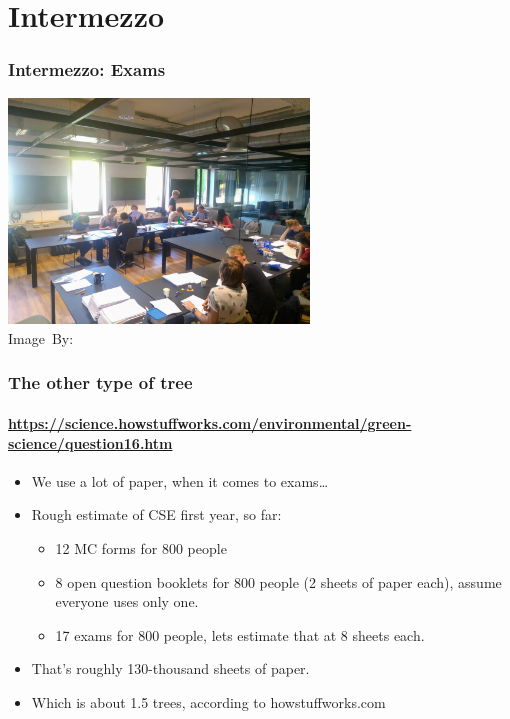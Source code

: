\section{Intermezzo}
\label{sec:intermezzo}

\begin{frame}
	\frametitle{Intermezzo: Exams}
	\begin{center}
		\includegraphics[width=0.6\textwidth]{figures/grading.jpg}\\
		\hspace*{15pt}\hbox{\scriptsize Image By:}
	\end{center}
\end{frame}

\begin{frame}
	\frametitle{The other type of tree}
	\framesubtitle{\url{https://science.howstuffworks.com/environmental/green-science/question16.htm}}
	\begin{itemize}
		\item We use a lot of paper, when it comes to exams\dots
			\pause
		\item Rough estimate of CSE first year, so far:
			\begin{itemize}
				\item 12 MC forms for 800 people
				\item 8 open question booklets for 800 people (2 sheets of paper each), assume everyone uses only one.
				\item 17 exams for 800 people, lets estimate that at 8 sheets each.
			\end{itemize}
			\pause
		\item	That's roughly 130-thousand sheets of paper.
			\pause
		\item Which is about 1.5 trees, according to howstuffworks.com
	\end{itemize}
\end{frame}

